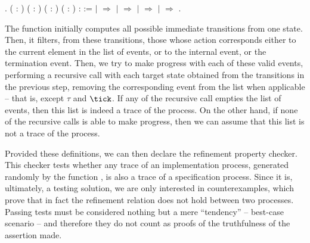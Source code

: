 \begin{coqdoccode}
	\coqdocindent{1.00em}
	.\coqdoceol
	\coqdocemptyline
	\coqdocnoindent
	 \coqdoceol
	\coqdocindent{1.00em}
	( : )\coqdoceol
	\coqdocindent{1.00em}
	( : )\coqdoceol
	\coqdocindent{1.00em}
	( : )\coqdoceol
	\coqdocindent{1.00em}
	( :  ) :  :=\coqdoceol
	\coqdocindent{1.00em}
	  \coqdoceol
	\coqdocindent{1.00em}
	\ensuremath{|}  \ensuremath{\Rightarrow} \coqdoceol
	\coqdocindent{1.00em}
	\ensuremath{|}   \ensuremath{\Rightarrow}\coqdoceol
	\coqdocindent{2.00em}
	      \coqdoceol
	\coqdocindent{2.00em}
	\ensuremath{|}  \ensuremath{\Rightarrow} \coqdoceol
	\coqdocindent{2.00em}
	\ensuremath{|}   \ensuremath{\Rightarrow} \coqdoceol
	\coqdocindent{2.00em}
	\coqdoceol
	\coqdocindent{1.00em}
	.\coqdoceol
\end{coqdoccode}


The function  initially computes all possible immediate transitions from one state. Then, it filters, from these transitions, those whose action corresponds either to the current element in the list of events, or to the internal event, or the termination event. Then, we try to make progress with each of these valid events, performing a recursive call with each target state obtained from the transitions in the previous step, removing the corresponding event from the list when applicable -- that is, except $ \tau $ and $ \tick $. If any of the recursive call empties the list of events, then this list is indeed a trace of the process. On the other hand, if none of the recursive calls is able to make progress, then we can assume that this list is not a trace of the process.

Provided these definitions, we can then declare the refinement property checker. This checker tests whether any trace of an implementation process, generated randomly by the function , is also a trace of a specification process. Since it is, ultimately, a testing solution, we are only interested in counterexamples, which prove that in fact the refinement relation does not hold between two processes. Passing tests must be considered nothing but a mere ``tendency'' -- best-case scenario -- and therefore they do not count as proofs of the truthfulness of the assertion made.

